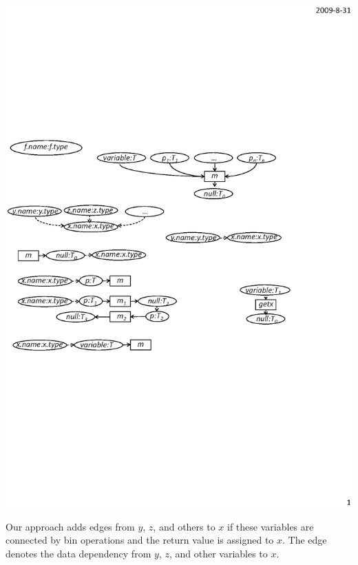 \begin{center}
\includegraphics[scale=0.7,clip]{figure/rule9.eps}%
\end{center}

Our approach adds edges from $y$, $z$, and others to $x$ if these
variables are connected by bin operations and the return value is
assigned to $x$. The edge denotes the data dependency from $y$, $z$,
and other variables to $x$.

